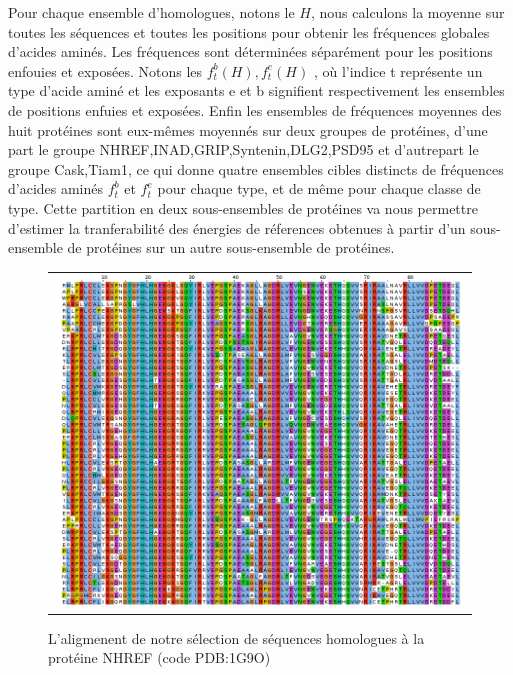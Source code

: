     Pour chaque ensemble d'homologues, notons le $H$, nous calculons la moyenne sur toutes les séquences et toutes les positions pour obtenir les fréquences globales d'acides aminés. Les fréquences sont déterminées séparément pour les positions enfouies et exposées. Notons les ${f^b_t(H),f^e_t(H)}$ , où l'indice t représente un type d'acide aminé et les exposants e et b signifient respectivement les ensembles de positions enfuies et exposées. Enfin les ensembles de fréquences moyennes des huit protéines sont eux-mêmes moyennés sur deux groupes de protéines, d'une part le groupe {NHREF,INAD,GRIP,Syntenin,DLG2,PSD95} et d'autrepart le groupe {Cask,Tiam1}, ce qui donne quatre ensembles cibles distincts de fréquences d'acides aminés $f^b_t$ et $f^e_t$ pour chaque type, et de même pour chaque classe de type. Cette partition en deux sous-ensembles de protéines va nous permettre d'estimer la tranferabilité des énergies de réferences obtenues à partir d'un sous-ensemble de protéines sur un autre sous-ensemble de protéines.

        
\clearpage

   \begin{figure}[t]
     \centering
     \begin{tabular}{c}
       \includegraphics[width=17cm]{homologues/1G9O.png} \\
     \end{tabular}
     \caption{L'aligmenent de notre sélection de séquences homologues à la protéine NHREF (code PDB:1G9O)}
\label{align_homo:NHREF}
   \end{figure}

